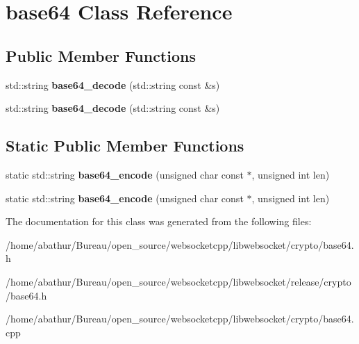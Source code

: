\hypertarget{classbase64}{\section{base64 Class Reference}
\label{classbase64}
}
\subsection*{Public Member Functions}
\begin{DoxyCompactItemize}
\item 
\hypertarget{classbase64_a868c90574983269a99ea666d195acb74}{std\-::string {\bfseries base64\-\_\-decode} (std\-::string const \&s)}\label{classbase64_a868c90574983269a99ea666d195acb74}

\item 
\hypertarget{classbase64_a868c90574983269a99ea666d195acb74}{std\-::string {\bfseries base64\-\_\-decode} (std\-::string const \&s)}\label{classbase64_a868c90574983269a99ea666d195acb74}

\end{DoxyCompactItemize}
\subsection*{Static Public Member Functions}
\begin{DoxyCompactItemize}
\item 
\hypertarget{classbase64_abc67c13bf770c841f7df0d41c7e786bf}{static std\-::string {\bfseries base64\-\_\-encode} (unsigned char const $\ast$, unsigned int len)}\label{classbase64_abc67c13bf770c841f7df0d41c7e786bf}

\item 
\hypertarget{classbase64_aadd25ee31e928994742bc1189efed9af}{static std\-::string {\bfseries base64\-\_\-encode} (unsigned char const $\ast$, unsigned int len)}\label{classbase64_aadd25ee31e928994742bc1189efed9af}

\end{DoxyCompactItemize}


The documentation for this class was generated from the following files\-:\begin{DoxyCompactItemize}
\item 
/home/abathur/\-Bureau/open\-\_\-source/websocketcpp/libwebsocket/crypto/base64.\-h\item 
/home/abathur/\-Bureau/open\-\_\-source/websocketcpp/libwebsocket/release/crypto/base64.\-h\item 
/home/abathur/\-Bureau/open\-\_\-source/websocketcpp/libwebsocket/crypto/base64.\-cpp\end{DoxyCompactItemize}
